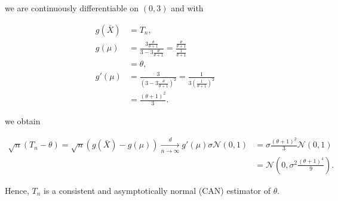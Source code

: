 \begin{solution}
\begin{enumerate}[label=(\alph*)]
  we are continuously differentiable on $(0,3)$ and with

  \begin{align*}
    g(\bar{X}) &= T_n, \\
    g(\mu) &= \frac{3\frac{\theta}{\theta + 1}}{3 - 3\frac{\theta}{\theta + 1}}
    = \frac{\frac{\theta}{\theta + 1}}{\frac{1}{\theta + 1}} \\
    &= \theta, \\
    g'(\mu) &= \frac{3}{(3-3\frac{\theta}{\theta + 1})^2}
    = \frac{1}{3(\frac{1}{\theta + 1})^2} \\
    &= \frac{(\theta + 1)^2}{3}.
  \end{align*}

  we obtain

  \begin{align*}
    \sqrt{n}(T_n - \theta) = \sqrt{n}(g(\bar{X}) - g(\mu)) 
    \xrightarrow[n \to \infty]{d} g'(\mu)\sigma\mathcal{N}(0, 1) 
    &= \sigma\frac{(\theta + 1)^2}{3} \mathcal{N}(0, 1) \\
    &= \mathcal{N}\left(0, \sigma^2\frac{(\theta + 1)^4}{9}\right).
  \end{align*}

  Hence, $T_n$ is a consistent and asymptotically normal (CAN) estimator of $\theta$.
\end{enumerate}


\end{solution}

